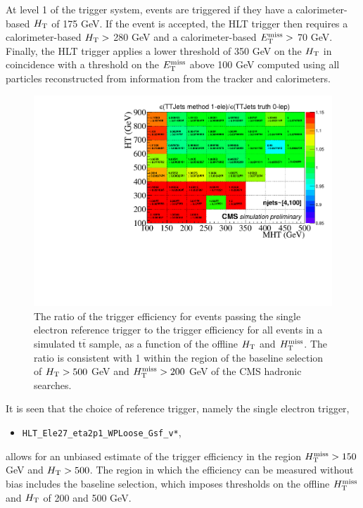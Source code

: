 At level 1 of the trigger system, events are triggered if they have a calorimeter-based $H_{\rm T}$ of 175 GeV. If the event is accepted, the HLT trigger then requires a calorimeter-based $H_{\rm T}>$ 280 GeV and a calorimeter-based $E_{\text{T}}^{\rm miss}>$ 70 GeV. Finally, the HLT trigger applies a lower threshold of 350 GeV on the $H_{\rm T}$ in coincidence with a threshold on the $E_{\text{T}}^{\rm miss}$ above 100 GeV computed using all particles reconstructed from information from the tracker and calorimeters.

\begin{figure}[tb!]
  \begin{center}
    \includegraphics[width=0.95\linewidth]{figures/trigger/EfficiencyRatioMethodTruth.pdf}
    \caption{
      The ratio of the trigger efficiency for events passing the single
      electron reference trigger to the trigger efficiency for all
      events in a simulated t$\bar{\text{t}}$ sample, as a function of the offline $H_{\rm T}$
      and $H_{\text{T}}^{\rm miss}$. The ratio is consistent with 1 within the region of
      the baseline selection of $H_{\rm T}>500$ GeV and $H_{\text{T}}^{\rm miss}>200$ GeV of the CMS hadronic searches.
    }
    \label{fig:2dEffRatio}
  \end{center}
\end{figure}
It is seen that the choice of reference trigger, namely the single electron trigger,
\begin{itemize}
  \item \texttt{HLT\_Ele27\_eta2p1\_WPLoose\_Gsf\_v*}, 
\end{itemize}
allows for an unbiased estimate of the trigger efficiency in the region $H_{\text{T}}^{\rm miss}>150$ GeV and $H_{\rm T}>500$. The region in which the efficiency can be measured without bias includes the baseline selection, which imposes thresholds on the offline $H_{\text{T}}^{\rm miss}$ and $H_{\rm T}$ of 200 and 500 GeV. 

